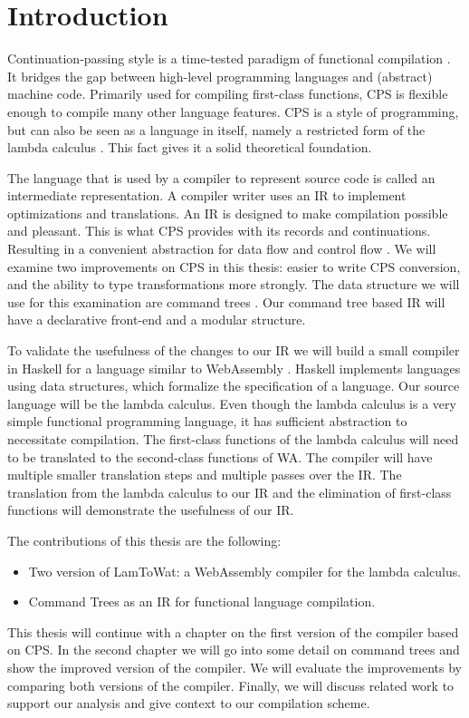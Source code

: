 
\chapter{\label{chap:introduction}Introduction}

Continuation-passing style is a time-tested paradigm of functional compilation \autocite{steele1978rabbit, DBLP:books/daglib/0022396}. It bridges the gap between high-level programming languages and (abstract) machine code. Primarily used for compiling first-class functions, CPS is flexible enough to compile many other language features. CPS is a style of programming, but can also be seen as a language in itself, namely a restricted form of the lambda calculus \autocite{barendregt1984lambda}. This fact gives it a solid theoretical foundation.

The language that is used by a compiler to represent source code is called an intermediate representation. A compiler writer uses an IR to implement optimizations and translations. An IR is designed to make compilation possible and pleasant. This is what CPS provides with its records and continuations. Resulting in a convenient abstraction for data flow and control flow \autocite{bruin2020framevm}. We will examine two improvements on CPS in this thesis: easier to write CPS conversion, and the ability to type transformations more strongly. The data structure we will use for this examination are command trees \autocite{commandtreespoulsen}. Our command tree based IR will have a declarative front-end and a modular structure.

To validate the usefulness of the changes to our IR we will build a small compiler in Haskell \autocite{haskellhomepage} for a language similar to WebAssembly \autocite{webassemblyhomepage}. Haskell implements languages using data structures, which formalize the specification of a language. Our source language will be the lambda calculus. Even though the lambda calculus is a very simple functional programming language, it has sufficient abstraction to necessitate compilation. The first-class functions of the lambda calculus will need to be translated to the second-class functions of WA. The compiler will have multiple smaller translation steps and multiple passes over the IR. The translation from the lambda calculus to our IR and the elimination of first-class functions will demonstrate the usefulness of our IR.

The contributions of this thesis are the following:
\begin{itemize}
\item Two version of LamToWat: a WebAssembly compiler for the lambda calculus.
\item Command Trees as an IR for functional language compilation.
\end{itemize}

This thesis will continue with a chapter on the first version of the compiler based on CPS. In the second chapter we will go into some detail on command trees and show the improved version of the compiler. We will evaluate the improvements by comparing both versions of the compiler. Finally, we will discuss related work to support our analysis and give context to our compilation scheme.